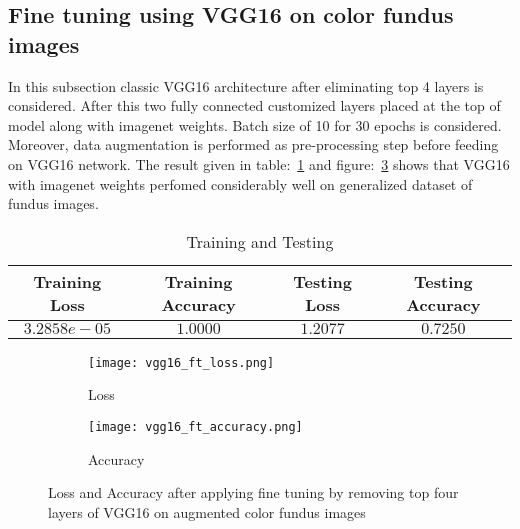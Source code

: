 \documentclass[12pt,a4paper,titlepage]{report}
\begin{document}
\subsection{Fine tuning using VGG16 on color fundus images}
In this subsection classic VGG16 architecture after eliminating top 4 layers is considered. After this two fully connected customized layers placed at the top of model along with imagenet weights. Batch size of 10 for 30 epochs is considered. Moreover, data augmentation is performed as pre-processing step before feeding on VGG16 network. The result given in table:~\ref{tab: Table-12} and figure:~\ref{fig: Image6} shows that VGG16 with imagenet weights perfomed considerably well on generalized dataset of fundus images.
\vspace{20pt}
\begin{table}[H]
\centering
\caption{Training and Testing}
\label{tab: Table-12}
\begin{tabular}{c c c c}
\hline
\textbf{Training Loss} & \textbf{Training Accuracy} & \textbf{Testing Loss} & \textbf{Testing Accuracy}\\
\hline
$3.2858e-05$ & $1.0000$ & $1.2077$ & $0.7250$\\
\hline
\end{tabular}
\end{table}

\begin{figure}[H]
\centering
\begin{subfigure}[h]{0.45\linewidth}
\texttt{[image: vgg16\_ft\_loss.png]}
\caption{Loss}
\label{fig:a}
\end{subfigure}
\quad
\begin{subfigure}[h]{0.45\linewidth}
\texttt{[image: vgg16\_ft\_accuracy.png]}
\caption{Accuracy}
\label{fig:b}
\end{subfigure}
\caption{Loss and Accuracy after applying fine tuning by removing top four layers of VGG16 on augmented color fundus images}
\label{fig: Image6}
\end{figure}
\end{document}
